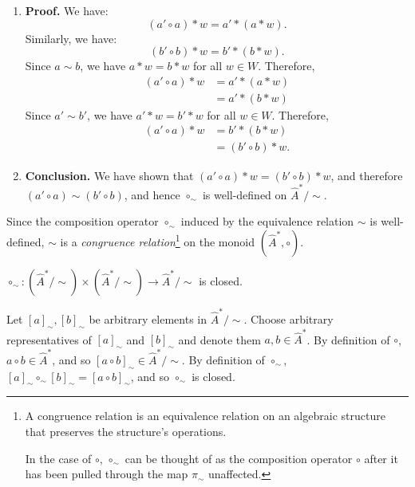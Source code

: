 \begin{proofE}
\begin{enumerate}
    \item \textbf{Proof.}
    We have:
    \begin{equation}
      (a' \circ a) \ast w = a' \ast (a \ast w).
    \end{equation}
    Similarly, we have:
    \begin{equation}
      (b' \circ b) \ast w = b' \ast (b \ast w).
    \end{equation}
    Since $a \sim b$, we have $a \ast w = b \ast w$ for all $w \in W$.
    Therefore,
    \begin{align}
        (a' \circ a) \ast w & = a' \ast (a \ast w)\\
        & = a' \ast (b \ast w)
    \end{align}
    Since $a' \sim b'$, we have $a' \ast w = b' \ast w$ for all $w \in W$.
    Therefore,
    \begin{align}
        (a' \circ a) \ast w & = b' \ast (b \ast w) \\
        & = (b' \circ b) \ast w.
    \end{align}

    \item \textbf{Conclusion.}
    We have shown that $(a' \circ a) \ast w = (b' \circ b) \ast w$, and therefore $(a' \circ a) \sim (b' \circ b)$, and hence $\circ_{\sim}$ is well-defined on $\hat{A}^{*}/\sim$.
\end{enumerate}
\end{proofE}


Since the composition operator $\circ_{\sim}$ induced by the equivalence relation $\sim$ is well-defined, $\sim$ is a \emph{congruence relation}\footnote{
    A congruence relation is an equivalence relation on an algebraic structure that preserves the structure's operations.
    
    In the case of $\circ$, $\circ_{\sim}$ can be thought of as the composition operator $\circ$ after it has been pulled through the map $\pi_{\sim}$ unaffected.
} on the monoid $(\hat{A}^{*}, \circ)$.

\begin{propositionE}
    \label{prp:circ_sim_closed}
    $\circ_{\sim}: (\hat{A}^{*}/\sim) \times (\hat{A}^{*}/\sim) \to \hat{A}^{*}/\sim$ is closed.
\end{propositionE}
\begin{proofE}
    Let $[a]_{\sim}, [b]_{\sim}$ be arbitrary elements in $\hat{A}^{*}/\sim$.
    Choose arbitrary representatives of $[a]_{\sim}$ and $[b]_{\sim}$ and denote them $a, b \in \hat{A}^{*}$.
    By definition of $\circ$, $a \circ b \in \hat{A}^{*}$, and so $[a \circ b]_{\sim} \in \hat{A}^{*}/\sim$.
    By definition of $\circ_{\sim}$, $[a]_{\sim} \circ_{\sim} [b]_{\sim} = [a \circ b]_{\sim}$, and so $\circ_{\sim}$ is closed.
\end{proofE}


